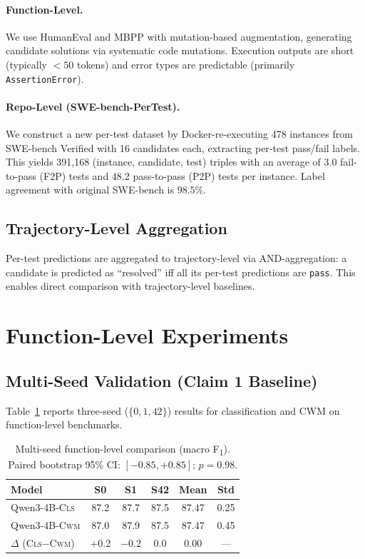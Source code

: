 \documentclass[11pt,a4paper]{article}
\newcommand{\cls}{\textsc{Cls}}
\newcommand{\cwm}{\textsc{Cwm}}
\newcommand{\fone}{F\textsubscript{1}}
\begin{document}
\paragraph{Function-Level.} We use HumanEval and MBPP with mutation-based augmentation, generating candidate solutions via systematic code mutations.
Execution outputs are short (typically $<50$ tokens) and error types are predictable (primarily \texttt{AssertionError}).

\paragraph{Repo-Level (SWE-bench-PerTest).} We construct a new per-test dataset by Docker-re-executing 478 instances from SWE-bench Verified with 16 candidates each, extracting per-test pass/fail labels.
This yields 391,168 (instance, candidate, test) triples with an average of 3.0 fail-to-pass (F2P) tests and 48.2 pass-to-pass (P2P) tests per instance.
Label agreement with original SWE-bench is $98.5\%$.

\subsection{Trajectory-Level Aggregation}

Per-test predictions are aggregated to trajectory-level via AND-aggregation: a candidate is predicted as ``resolved'' iff all its per-test predictions are \texttt{pass}.
This enables direct comparison with trajectory-level baselines.

\section{Function-Level Experiments}
\label{sec:func-results}

\subsection{Multi-Seed Validation (Claim 1 Baseline)}

Table~\ref{tab:multiseed} reports three-seed ($\{0, 1, 42\}$) results for classification and CWM on function-level benchmarks.

\begin{table}[t]
\centering
\small
\begin{tabular}{lccccc}
\toprule
\textbf{Model} & \textbf{S0} & \textbf{S1} & \textbf{S42} & \textbf{Mean} & \textbf{Std} \\
\midrule
Qwen3-4B-\cls & 87.2 & 87.7 & 87.5 & 87.47 & 0.25 \\
Qwen3-4B-\cwm & 87.0 & 87.9 & 87.5 & 87.47 & 0.45 \\
\midrule
$\Delta$ (\cls$-$\cwm) & +0.2 & $-$0.2 & 0.0 & 0.00 & --- \\
\bottomrule
\end{tabular}
\caption{Multi-seed function-level comparison (macro \fone). Paired bootstrap 95\% CI: $[-0.85, +0.85]$; $p{=}0.98$.}
\label{tab:multiseed}
\end{table}
\end{document}
